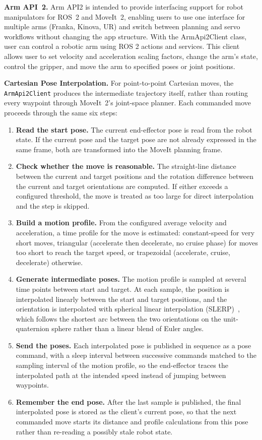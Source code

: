 \documentclass[oneside,studentpaper]{wbk}
\begin{document}
\textbf{Arm API~2.} Arm API2 is intended to provide interfacing support for robot manipulators for ROS~2 and MoveIt~2, enabling users to use one interface for multiple arms (Franka, Kinova, UR) and switch between planning and servo workflows without changing the app structure. With the ArmApi2Client class, user can control a robotic arm using ROS 2 actions and services. This client allows user to set velocity and acceleration scaling factors, change the arm's state, control the gripper, and move the arm to specified poses or joint positions.

\textbf{Cartesian Pose Interpolation.} For point-to-point Cartesian moves, the \texttt{ArmApi2Client} produces the intermediate trajectory itself, rather than routing every waypoint through MoveIt~2's joint-space planner. Each commanded move proceeds through the same six steps:

\begin{enumerate}
  \item \textbf{Read the start pose.} The current end-effector pose is read from the robot state. If the current pose and the target pose are not already expressed in the same frame, both are transformed into the MoveIt planning frame.
  \item \textbf{Check whether the move is reasonable.} The straight-line distance between the current and target positions and the rotation difference between the current and target orientations are computed. If either exceeds a configured threshold, the move is treated as too large for direct interpolation and the step is skipped.
  \item \textbf{Build a motion profile.} From the configured average velocity and acceleration, a time profile for the move is estimated: constant-speed for very short moves, triangular (accelerate then decelerate, no cruise phase) for moves too short to reach the target speed, or trapezoidal (accelerate, cruise, decelerate) otherwise.
  \item \textbf{Generate intermediate poses.} The motion profile is sampled at several time points between start and target. At each sample, the position is interpolated linearly between the start and target positions, and the orientation is interpolated with spherical linear interpolation (SLERP)~\cite{shoemake1985animating}, which follows the shortest arc between the two orientations on the unit-quaternion sphere rather than a linear blend of Euler angles.
  \item \textbf{Send the poses.} Each interpolated pose is published in sequence as a pose command, with a sleep interval between successive commands matched to the sampling interval of the motion profile, so the end-effector traces the interpolated path at the intended speed instead of jumping between waypoints.
  \item \textbf{Remember the end pose.} After the last sample is published, the final interpolated pose is stored as the client's current pose, so that the next commanded move starts its distance and profile calculations from this pose rather than re-reading a possibly stale robot state.
\end{enumerate}
\end{document}
